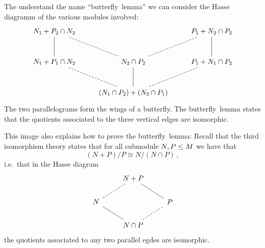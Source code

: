\begin{fluff}
  The understand the name \enquote{butterfly~lemma} we can consider the Hasse diagramm of the various modules involved:
  \[
    \begin{tikzcd}[row sep = large]
        N_1 + P_2 \cap N_2
      & {}
      & P_1 + N_2 \cap P_2
      \\
        N_1 + P_1 \cap N_2
        \arrow[-]{u}
      & N_2 \cap P_2
        \arrow[-, dashed]{lu}
        \arrow[-, dashed]{ru}
      & P_1 + N_1 \cap P_2
        \arrow[-]{u}
      \\
        {}
      & (N_1 \cap P_2) + (N_2 \cap P_1)
        \arrow[-, dashed]{lu}
        \arrow[-]{u}
        \arrow[-, dashed]{ru}
      & {}
    \end{tikzcd}
  \]
  The two parallelograms form the wings of a butterfly.
  The butterfly~lemma states that the quotients associated to the three vertical edges are isomorphic.
  
  This image also explains how to prove the butterfly~lemma:
  Recall that the third isomorphism theory states that for all submodule $N, P \leq M$ we have that
  \[
          (N + P)/P
    \cong N/(N \cap P) \,,
  \]
  i.e.\ that in the Hasse diagram
  \[
    \begin{tikzcd}
        {}
      & N + P
      & {}
      \\
        N
        \arrow[-, dashed]{ru}
      & {}
      & P
        \arrow[-]{lu}
      \\
        {}
      & N \cap P
        \arrow[-]{lu}
        \arrow[-, dashed]{ru}
      & {}
    \end{tikzcd}
  \]
  the quotients associated to any two parallel egdes are isomorphic.
\end{fluff}


